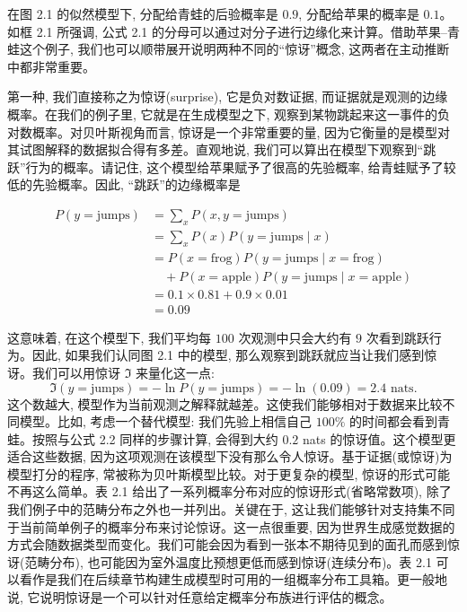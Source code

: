 在图 2.1 的似然模型下, 分配给青蛙的后验概率是 $0.9$, 分配给苹果的概率是 $0.1$。如框 2.1 所强调, 公式 2.1 的分母可以通过对分子进行边缘化来计算。借助苹果--青蛙这个例子, 我们也可以顺带展开说明两种不同的``惊讶''概念, 这两者在主动推断中都非常重要。

第一种, 我们直接称之为惊讶(surprise), 它是负对数证据, 而证据就是观测的边缘概率。在我们的例子里, 它就是在生成模型之下, 观察到某物跳起来这一事件的负对数概率。对贝叶斯视角而言, 惊讶是一个非常重要的量, 因为它衡量的是模型对其试图解释的数据拟合得有多差。直观地说, 我们可以算出在模型下观察到``跳跃''行为的概率。请记住, 这个模型给苹果赋予了很高的先验概率, 给青蛙赋予了较低的先验概率。因此, ``跳跃''的边缘概率是

\begin{equation}
\begin{aligned}
P(y = \text{jumps}) &= \sum_x P(x, y = \text{jumps}) \\
&= \sum_x P(x)P(y = \text{jumps} \mid x) \\
&= P(x = \text{frog})P(y = \text{jumps} \mid x = \text{frog}) \\
&\quad + P(x = \text{apple})P(y = \text{jumps} \mid x = \text{apple}) \\
&= 0.1 \times 0.81 + 0.9 \times 0.01 \\
&= 0.09
\end{aligned}
\tag{2.2}
\end{equation}

这意味着, 在这个模型下, 我们平均每 $100$ 次观测中只会大约有 $9$ 次看到跳跃行为。因此, 如果我们认同图 2.1 中的模型, 那么观察到跳跃就应当让我们感到惊讶。我们可以用惊讶 $\Im$ 来量化这一点:
\[
\Im(y = \text{jumps}) = - \ln P(y = \text{jumps}) = - \ln(0.09) = 2.4 \text{ nats}.
\]
这个数越大, 模型作为当前观测之解释就越差。这使我们能够相对于数据来比较不同模型。比如, 考虑一个替代模型: 我们先验上相信自己 $100\%$ 的时间都会看到青蛙。按照与公式 2.2 同样的步骤计算, 会得到大约 $0.2$ nats 的惊讶值。这个模型更适合这些数据, 因为这项观测在该模型下没有那么令人惊讶。基于证据(或惊讶)为模型打分的程序, 常被称为贝叶斯模型比较。对于更复杂的模型, 惊讶的形式可能不再这么简单。表 2.1 给出了一系列概率分布对应的惊讶形式(省略常数项), 除了我们例子中的范畴分布之外也一并列出。关键在于, 这让我们能够针对支持集不同于当前简单例子的概率分布来讨论惊讶。这一点很重要, 因为世界生成感觉数据的方式会随数据类型而变化。我们可能会因为看到一张本不期待见到的面孔而感到惊讶(范畴分布), 也可能因为室外温度比预想更低而感到惊讶(连续分布)。表 2.1 可以看作是我们在后续章节构建生成模型时可用的一组概率分布工具箱。更一般地说, 它说明惊讶是一个可以针对任意给定概率分布族进行评估的概念。

